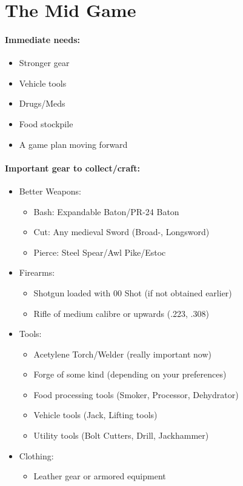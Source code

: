 \section{The Mid Game}

\paragraph{Immediate needs:}
\begin{itemize}
\item Stronger gear
\item Vehicle tools
\item Drugs/Meds
\item Food stockpile
\item A game plan moving forward
\end{itemize}

\paragraph{Important gear to collect/craft:}
\begin{itemize}
\item Better Weapons:
	\begin{itemize}
	\item Bash: Expandable Baton/PR-24 Baton
	\item Cut: Any medieval Sword (Broad-, Longsword)
	\item Pierce: Steel Spear/Awl Pike/Estoc
	\end{itemize}
\item Firearms:
	\begin{itemize}
	\item Shotgun loaded with 00 Shot (if not obtained earlier)
	\item Rifle of medium calibre or upwards (.223, .308)
	\end{itemize}
\item Tools:
	\begin{itemize}
	\item Acetylene Torch/Welder (really important now)
	\item Forge of some kind (depending on your preferences)
	\item Food processing tools (Smoker, Processor, Dehydrator)
	\item Vehicle tools (Jack, Lifting tools)
	\item Utility tools (Bolt Cutters, Drill, Jackhammer)
	\end{itemize}
\item Clothing:
	\begin{itemize}
	\item Leather gear or armored equipment	
	\end{itemize}
\end{itemize}

